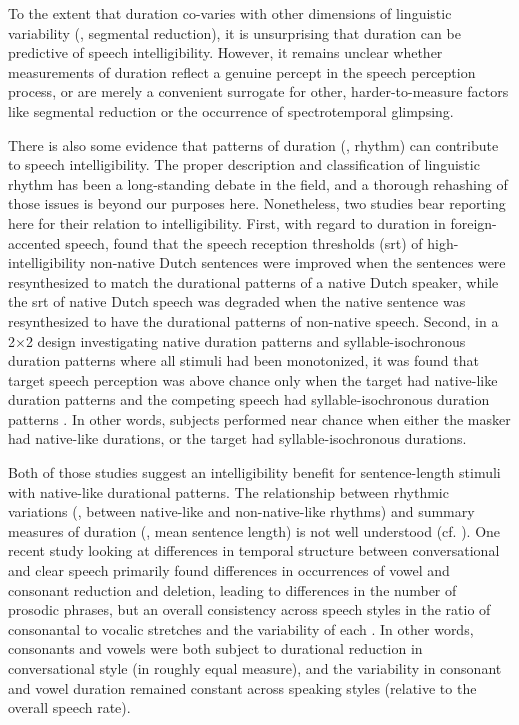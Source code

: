 To the extent that duration co-varies with other dimensions of linguistic variability (\eg, segmental reduction), it is unsurprising that duration can be predictive of speech intelligibility.  However, it remains unclear whether measurements of duration reflect a genuine percept in the speech perception process, or are merely a convenient surrogate for other, harder-to-measure factors like segmental reduction or the occurrence of spectrotemporal glimpsing.

There is also some evidence that patterns of duration (\ie, rhythm) can contribute to speech intelligibility.  The proper description and classification of linguistic rhythm has been a long-standing debate in the field, and a thorough rehashing of those issues is beyond our purposes here.\footnotemark{}  Nonetheless, two studies bear reporting here for their relation to intelligibility.  First, with regard to duration in foreign-accented speech, \citet{QueneVanDelft2010} found that the speech reception thresholds (\ac{srt}) of high-intelligibility non-native Dutch sentences were improved when the sentences were resynthesized to match the durational patterns of a native Dutch speaker, while the \ac{srt} of native Dutch speech was degraded when the native sentence was resynthesized to have the durational patterns of non-native speech.  Second, in a 2×2 design investigating native duration patterns and syllable-isochronous duration patterns where all stimuli had been monotonized, it was found that target speech perception was above chance only when the target had native-like duration patterns and the competing speech had syllable-isochronous duration patterns \citep{CushingDellwo2010}.  In other words, subjects performed near chance when either the masker had native-like durations, or the target had syllable-isochronous durations.  

Both of those studies suggest an intelligibility benefit for sentence-length stimuli with native-like durational patterns.  The relationship between rhythmic variations (\eg, between native-like and non-native-like rhythms) and summary measures of duration (\eg, mean sentence length) is not well understood (cf. \citealt{Ramus2002}).  One recent study looking at differences in temporal structure between conversational and clear speech primarily found differences in occurrences of vowel and consonant reduction and deletion, leading to differences in the number of prosodic phrases, but an overall consistency across speech styles in the ratio of consonantal to vocalic stretches and the variability of each \citep{SmiljanicBradlow2008}.  In other words, consonants and vowels were both subject to durational reduction in conversational style (in roughly equal measure), and the variability in consonant and vowel duration remained constant across speaking styles (relative to the overall speech rate).

